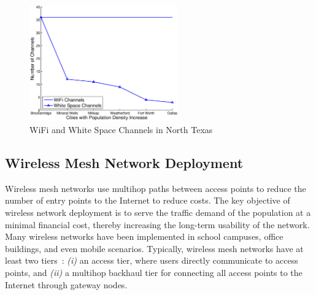 \begin{figure}
\vspace{-0.0in}
\centering
\includegraphics[width=64mm]{figures/wschannels}
\vspace{-0.1in}
\caption{WiFi and White Space Channels in North Texas}
\label{fig:wschannels}
\vspace{-0.3in}
\end{figure}


\subsection{Wireless Mesh Network Deployment} 
Wireless mesh networks use multihop paths between access points to reduce the number of entry points 
to the Internet to reduce costs. 
The key objective of wireless network deployment is 
to serve the traffic demand of the population at a minimal financial cost, thereby increasing the long-term 
usability of the network. 
Many wireless networks have been implemented 
in school campuses, office buildings, and even mobile scenarios. Typically, wireless mesh networks 
have at least two tiers~\cite{CRSK06}: {\it (i)} an access tier, where users directly communicate to 
access points, and {\it (ii)} a multihop backhaul tier for connecting all access points to the 
Internet through gateway nodes. 


